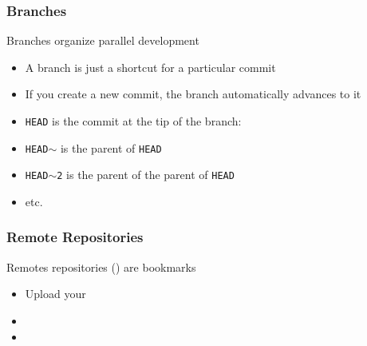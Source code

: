 \begin{frame}
  \frametitle{Branches}

  Branches organize parallel development
  \begin{itemize}
  \item A branch is just a shortcut for a particular commit
  \item If you create a new commit, the branch automatically advances
    to it
  \item \texttt{HEAD} is the commit at the tip of the branch:\\
  \item \texttt{HEAD$\sim$} is the parent of \texttt{HEAD}
  \item \texttt{HEAD$\sim$2} is the parent of the parent of
    \texttt{HEAD}
  \item etc.
  \end{itemize}
\end{frame}


\begin{frame}
  \frametitle{Remote Repositories}
  
  Remotes repositories () are bookmarks
  \begin{itemize}
  \item Upload your 
  \item 
  \item 
  \end{itemize}

\end{frame}




